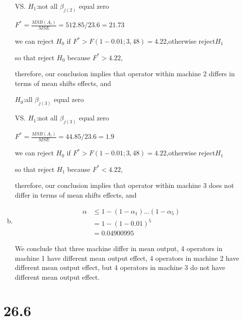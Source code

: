 \documentclass{article}\usepackage[]{graphicx}\usepackage[]{color}
\begin{document}
\begin{enumerate}[(a)]
\begin{center}
VS. $H_1$:not all $\beta_{j(2)}$ equal zero

$F^*=\frac{MSB(A_i)}{MSE} = 512.85/23.6  = 21.73$

we can reject $H_0$ if $F^* > F(1-0.01;3,48)=4.22$,otherwise reject$H_1$

so that reject $H_0$ because $F^*>4.22$,

therefore, our conclusion implies that operator within machine 2 differs in terms of mean shifts effects, and 
\end{center}

\begin{center}
$H_0$:all $\beta_{j(3)}$ equal zero

VS. $H_1$:not all $\beta_{j(3)}$ equal zero

$F^*=\frac{MSB(A_i)}{MSE} = 44.85/23.6  = 1.9$

we can reject $H_0$ if $F^* > F(1-0.01;3,48)=4.22$,otherwise reject$H_1$

so that reject $H_1$ because $F^*<4.22$,

therefore, our conclusion implies that operator within machine 3 does not differ in terms of mean shifts effects, and 
\end{center}

\item

\begin{displaymath}
\begin{split}
  \alpha &\leq 1 -(1-\alpha_1)...(1-\alpha_5)\\
         &= 1-(1-0.01)^5\\
         &= 0.04900995
\end{split}
\end{displaymath}

\qquad We conclude that three machine differ in mean output, 4 operators in machine 1 have different mean output effect, 4 operators in machine 2 have different mean output effect, but 4 operators in machine 3 do not have different mean output effect.

\end{enumerate}

\section{26.6}
\end{document}
